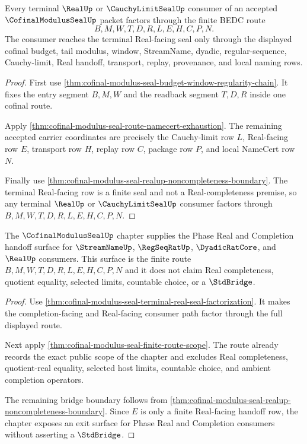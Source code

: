 \begin{theorem}
\label{thm:cofinal-modulus-seal-terminal-real-seal-factorization}
Every terminal $\RealUp$ or $\CauchyLimitSealUp$ consumer of an accepted $\CofinalModulusSealUp$ packet factors through the finite BEDC route
$$
B,M,W,T,D,R,L,E,H,C,P,N.
$$
The consumer reaches the terminal Real-facing seal only through the displayed cofinal budget, tail modulus, window, StreamName, dyadic, regular-sequence, Cauchy-limit, Real handoff, transport, replay, provenance, and local naming rows.
\end{theorem}
\begin{proof}
First use \autoref{thm:cofinal-modulus-seal-budget-window-regularity-chain}. It fixes the entry segment $B,M,W$ and the readback segment $T,D,R$ inside one cofinal route.

Apply \autoref{thm:cofinal-modulus-seal-route-namecert-exhaustion}. The remaining accepted carrier coordinates are precisely the Cauchy-limit row $L$, Real-facing row $E$, transport row $H$, replay row $C$, package row $P$, and local NameCert row $N$.

Finally use \autoref{thm:cofinal-modulus-seal-realup-noncompleteness-boundary}. The terminal Real-facing row is a finite seal and not a Real-completeness premise, so any terminal $\RealUp$ or $\CauchyLimitSealUp$ consumer factors through $B,M,W,T,D,R,L,E,H,C,P,N$.
\end{proof}

\begin{theorem}
\label{thm:cofinal-modulus-seal-open-phase-exit-surface}
The $\CofinalModulusSealUp$ chapter supplies the Phase Real and Completion handoff surface for $\StreamNameUp$, $\RegSeqRatUp$, $\DyadicRatCore$, and $\RealUp$ consumers. This surface is the finite route $B,M,W,T,D,R,L,E,H,C,P,N$ and it does not claim Real completeness, quotient equality, selected limits, countable choice, or a $\StdBridge$.
\end{theorem}
\begin{proof}
Use \autoref{thm:cofinal-modulus-seal-terminal-real-seal-factorization}. It makes the completion-facing and Real-facing consumer path factor through the full displayed route.

Next apply \autoref{thm:cofinal-modulus-seal-finite-route-scope}. The route already records the exact public scope of the chapter and excludes Real completeness, quotient-real equality, selected host limits, countable choice, and ambient completion operators.

The remaining bridge boundary follows from \autoref{thm:cofinal-modulus-seal-realup-noncompleteness-boundary}. Since $E$ is only a finite Real-facing handoff row, the chapter exposes an exit surface for Phase Real and Completion consumers without asserting a $\StdBridge$.
\end{proof}


